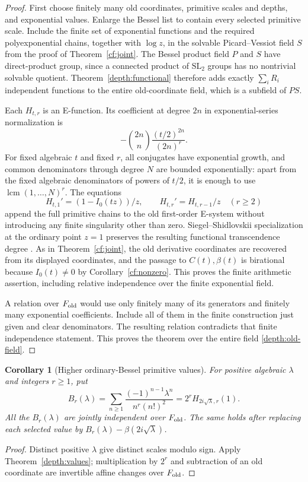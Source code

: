 \documentclass[11pt]{article}
\newtheorem{corollary}[theorem]{Corollary}
\theoremstyle{definition}
\theoremstyle{remark}
\begin{document}
\begin{proof}
First choose finitely many old coordinates, primitive scales and
depths, and exponential values.  Enlarge the Bessel list to contain
every selected primitive scale.  Include the finite set of
exponential functions and the required polyexponential chains,
together with $\log z$, in the solvable Picard--Vessiot field $S$
from the proof of Theorem~\ref{cf:joint}.  The Bessel product field
$P$ and $S$ have direct-product group, since a connected product
of $\mathrm{SL}_2$ groups has no nontrivial solvable quotient.
Theorem~\ref{depth:functional} therefore adds exactly
$\sum_iR_i$ independent functions to the entire old-coordinate
field, which is a subfield of $PS$.

Each $H_{t,r}$ is an E-function.  Its coefficient at degree $2n$
in exponential-series normalization is
\[
       -\binom{2n}{n}\frac{(t/2)^{2n}}{(2n)^r}.
\]
For fixed algebraic $t$ and fixed $r$, all conjugates have
exponential growth, and common denominators through degree $N$
are bounded exponentially: apart from the fixed algebraic
denominators of powers of $t/2$, it is enough to use
$\operatorname{lcm}(1,\ldots,N)^r$.
The equations
\[
 H_{t,1}'=(1-I_0(tz))/z,
 \qquad H_{t,r}'=H_{t,r-1}/z\quad(r\ge2)
\]
append the full primitive chains to the old first-order E-system
without introducing any finite singularity other than zero.
Siegel--Shidlovskii specialization at the ordinary point $z=1$
preserves the resulting functional transcendence degree
\cite{Beukers}.  As in Theorem~\ref{cf:joint}, the old derivative
coordinates are recovered from its displayed coordinates, and
the passage to $C(t),\beta(t)$ is birational because
$I_0(t)\ne0$ by Corollary~\ref{cf:nonzero}.  This proves the
finite arithmetic assertion, including relative independence
over the finite exponential field.

A relation over $F_{\rm old}$ would use only finitely many of
its generators and finitely many exponential coefficients.
Include all of them in the finite construction just given and
clear denominators.  The resulting relation contradicts that
finite independence statement.  This proves the theorem over
the entire field \eqref{depth:old-field}.
\end{proof}

\begin{corollary}[Higher ordinary-Bessel primitive values]
\label{depth:B}
For positive algebraic $\lambda$ and integers $r\ge1$, put
\[
 B_r(\lambda)=\sum_{n\ge1}
        \frac{(-1)^{n-1}\lambda^n}{n^r(n!)^2}
        =2^rH_{2i\sqrt\lambda,r}(1).
\]
All the $B_r(\lambda)$ are jointly independent over $F_{\rm old}$.
The same holds after replacing each selected value by
$B_r(\lambda)-\beta(2i\sqrt\lambda)$.
\end{corollary}
\begin{proof}
Distinct positive $\lambda$ give distinct scales modulo sign.
Apply Theorem~\ref{depth:values}; multiplication by $2^r$ and
subtraction of an old coordinate are invertible affine changes
over $F_{\rm old}$.
\end{proof}
\end{document}
